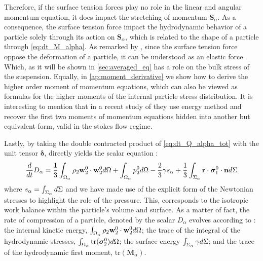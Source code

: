 Therefore, if the surface tension forces play no role in the linear and angular momentum equation, it does impact the stretching of momentum $\textbf{S}_\alpha$.
As a consequence, the surface tension force impact the hydrodynamic behavior of a particle solely through its action on $\textbf{S}_\alpha$, which is related to the shape of a particle through \ref{eq:dt_M_alpha}.
As remarked by \citet{batchelor1970stress}, since the surface tension force oppose the deformation of a particle, it can be understood as an elastic force. 
Which, as it will be shown in \ref{sec:averaged_eq} has a role on the bulk stress of the suspension. 
Equally, in \ref{ap:moment_derivative} we show how to derive the higher order moment of momentum equations, which can also be viewed as formulas for the higher moments of the internal particle stress distribution. 
It is interesting to mention that in a recent study of \citet{dolata2021faxen} they use energy method and recover the first two moments of momentum equations hidden into another but equivalent form, valid in the stokes flow regime. 


Lastly, by taking the double contracted product of \ref{eq:dt_Q_alpha_tot} with the unit tensor $\bm\delta$, directly yields the scalar equation :
\begin{equation}
    \frac{d}{d t} {D_\alpha}
    = \frac{1}{3}\int_{\Omega_\alpha}  \rho_2 \textbf{w}_2^0 \cdot \textbf{w}_2^0 d\Omega
    + \int_{\Omega_\alpha} p_2^0 d\Omega 
    - \frac{2}{3} \gamma s_\alpha
    + \frac{1}{3}\int_{\Sigma_\alpha} \textbf{r}\cdot\bm\sigma_1^0\cdot \textbf{n} d\Sigma
    \label{eq:dt_D_alpha}
\end{equation}
where $s_\alpha = \int_{\Sigma_\alpha}  d\Sigma$ and we have made use of the explicit form of the Newtonian stresses to highlight the role of the pressure. 
This, corresponds to the isotropic work balance within the particle's volume and surface. 
As a matter of fact, the rate of compression of a particle, denoted by the scalar $D_\alpha$ evolves according to : 
the internal kinetic energy, $\int_{\Omega_\alpha} \rho_2 \textbf{w}_2^0 \cdot \textbf{w}_2^0  d\Omega$;
the trace of the integral of the hydrodynamic stresses, $\int_{\Omega_\alpha}  \text{tr}(\bm{\sigma}_2^0) d\Omega$; 
the surface energy $\int_{\Sigma_\alpha}  \gamma  d\Sigma$; 
and the trace of the hydrodynamic first moment, $\text{tr}(\textbf{M}_\alpha)$.

